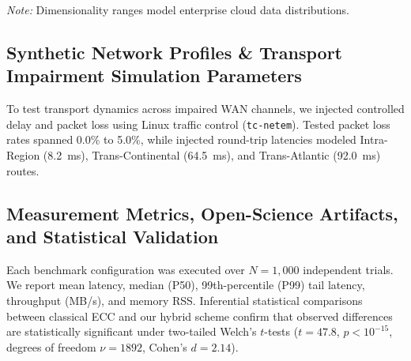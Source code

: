 \documentclass[pdflatex,sn-mathphys,Numbered]{sn-jnl}%
\theoremstyle{thmstyleone}%
\theoremstyle{thmstyletwo}%
\theoremstyle{thmstylethree}%
\begin{document}
\begin{table}[!htbp]
\centering
\caption{Synthetic workload characteristics and dimensionality profiles.}
\label{tab:workload_profiles}
\vspace{0.3em}
\raggedright\small\textit{Note:} Dimensionality ranges model enterprise cloud data distributions.
\end{table}

\subsection{\textbf{Synthetic Network Profiles \& Transport Impairment Simulation Parameters}}
To test transport dynamics across impaired WAN channels, we injected controlled delay and packet loss using Linux traffic control (\texttt{tc-netem}). Tested packet loss rates spanned 0.0\% to 5.0\%, while injected round-trip latencies modeled Intra-Region (8.2~ms), Trans-Continental (64.5~ms), and Trans-Atlantic (92.0~ms) routes.

\subsection{\textbf{Measurement Metrics, Open-Science Artifacts, and Statistical Validation}}
Each benchmark configuration was executed over $N = 1{,}000$ independent trials. We report mean latency, median (P50), 99th-percentile (P99) tail latency, throughput (MB/s), and memory RSS. Inferential statistical comparisons between classical ECC and our hybrid scheme confirm that observed differences are statistically significant under two-tailed Welch's $t$-tests ($t = 47.8$, $p < 10^{-15}$, degrees of freedom $\nu = 1892$, Cohen's $d = 2.14$).
\end{document}
